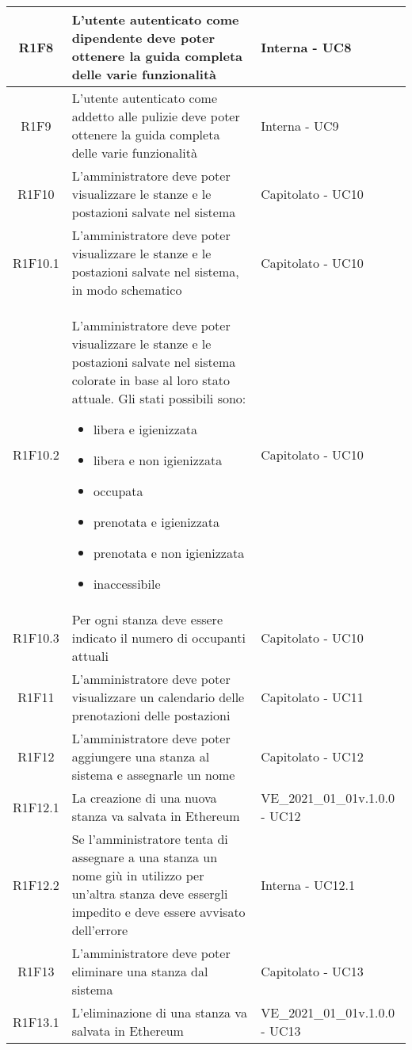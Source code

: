 \begin{center}
\begin{longtable}{|c|p{10cm}|p{4cm}|}
		\hline
		R1F8	&	L'utente autenticato come dipendente deve poter ottenere la guida completa delle varie funzionalità& Interna - UC8	\\
		\hline
		R1F9	&	L'utente autenticato come addetto alle pulizie deve poter ottenere la guida completa delle varie funzionalità& Interna - UC9	\\
		\hline
		R1F10&L'amministratore deve poter visualizzare le stanze e le postazioni salvate nel sistema& Capitolato - UC10	\\
		\hline
		R1F10.1&L'amministratore deve poter visualizzare le stanze e le postazioni salvate nel sistema, in modo schematico& Capitolato - UC10	\\
		\hline
		R1F10.2&L'amministratore deve poter visualizzare le stanze e le postazioni salvate nel sistema colorate in base al loro stato attuale. Gli stati possibili sono:
		\begin{itemize}
			\item libera e igienizzata
			\item libera e non igienizzata
			\item occupata
			\item prenotata e igienizzata
			\item prenotata e non igienizzata
			\item inaccessibile
		\end{itemize}& Capitolato - UC10	\\
		\hline
		R1F10.3&Per ogni stanza deve essere indicato il numero di occupanti attuali	& Capitolato - UC10	\\
		\hline
		R1F11&L'amministratore deve poter visualizzare un calendario delle prenotazioni delle postazioni	& Capitolato - UC11	\\
		\hline
		R1F12&L'amministratore deve poter aggiungere una stanza al sistema e assegnarle un nome	& Capitolato - UC12	\\
		\hline
		R1F12.1&	La creazione di una nuova stanza va salvata in Ethereum&VE\_2021\_01\_01v.1.0.0 - UC12 	\\
		\hline
		R1F12.2 & Se l'amministratore tenta di assegnare a una stanza un nome giù in utilizzo per un'altra stanza deve essergli impedito e deve essere avvisato dell'errore & Interna - UC12.1 \\
		R1F13&L'amministratore deve poter eliminare una stanza dal sistema	& Capitolato - UC13	\\
		\hline
		R1F13.1&L'eliminazione di una stanza va salvata in Ethereum	& VE\_2021\_01\_01v.1.0.0 - UC13	\\

\end{longtable}
\end{center}
